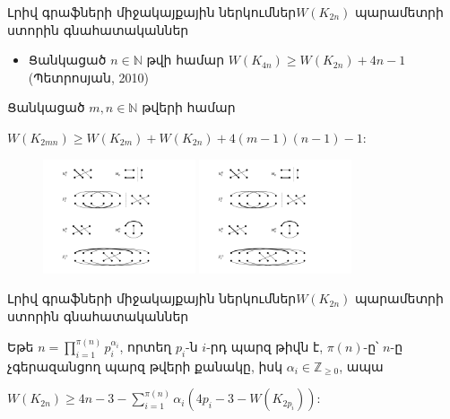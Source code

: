 \begin{frame}{Լրիվ գրաֆների միջակայքային ներկումներ}{$W(K_{2n})$ պարամետրի ստորին գնահատականներ}

\begin{itemize}
\item Ցանկացած $n\in \mathbb{N}$ թվի համար $W(K_{4n}) \geq W(K_{2n}) + 4n-1$ (Պետրոսյան, 2010)
\end{itemize}

\begin{theorem}[1.4.4]
Ցանկացած $m,n \in\mathbb{N}$ թվերի համար
\begin{center}
$W(K_{2mn}) \geq W(K_{2m}) + W(K_{2n}) + 4(m-1)(n-1) - 1$:
\end{center}
\end{theorem}

\begin{figure}[t!]
\centering
\includegraphics[trim={0 10cm 0 0cm},clip,width=0.4\textwidth]{figures/K_18-2.pdf}
\hspace{0.5cm}
\includegraphics[trim={0 0.4cm 0 9cm},clip,width=0.4\textwidth]{figures/K_18-2.pdf}
\end{figure}


\end{frame}

\begin{frame}{Լրիվ գրաֆների միջակայքային ներկումներ}{$W(K_{2n})$ պարամետրի ստորին գնահատականներ}

\begin{theorem}[1.4.5]
Եթե $n = \prod\limits_{i=1}^{\pi(n)}{p_i^{\alpha_i}}$, որտեղ $p_i$-ն $i$-րդ պարզ թիվն է, $\pi(n)$-ը՝ $n$-ը չգերազանցող պարզ թվերի քանակը, իսկ $\alpha_i \in \mathbb{Z}_{\geq 0}$, ապա
\begin{center}
$W(K_{2n}) \geq 4n - 3 - \sum\limits_{i=1}^{\pi(n)}{\alpha_i\left(4p_i-3-W(K_{2p_i})\right)}$:
\end{center}
\end{theorem}

\end{frame}

